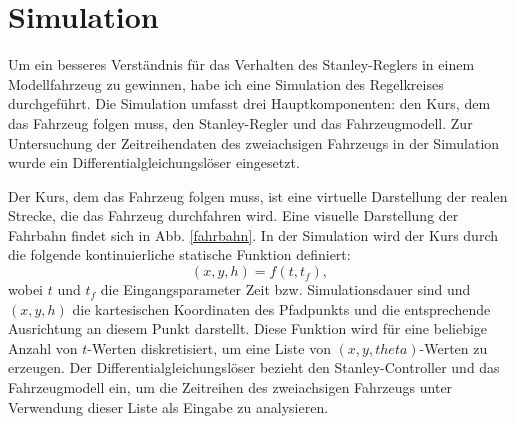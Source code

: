 \documentclass[arbeit=studie,oneside,BCOR=12mm]{ArbeitRST}
\begin{document}

\section{Simulation}


Um ein besseres Verständnis für das Verhalten des Stanley-Reglers in einem
Modellfahrzeug zu gewinnen, habe ich eine Simulation des
Regelkreises durchgeführt. Die Simulation umfasst drei Hauptkomponenten: den
Kurs, dem das Fahrzeug folgen muss, den Stanley-Regler und das Fahrzeugmodell.
Zur Untersuchung der Zeitreihendaten des zweiachsigen Fahrzeugs in der
Simulation wurde ein Differentialgleichungslöser eingesetzt.

Der Kurs, dem das Fahrzeug folgen muss, ist eine virtuelle Darstellung der
realen Strecke, die das Fahrzeug durchfahren wird. Eine visuelle
Darstellung der Fahrbahn findet sich in Abb. \ref{fahrbahn}. In der Simulation wird der
Kurs durch die folgende kontinuierliche statische Funktion definiert:
\begin{equation} 
  (x, y, h) = f(t, t_f), 
\end{equation} 
wobei $t$ und $t_f$ die Eingangsparameter Zeit bzw. Simulationsdauer sind
und $(x, y, h)$ die kartesischen Koordinaten des Pfadpunkts und die
entsprechende Ausrichtung an diesem Punkt darstellt. Diese Funktion wird für
eine beliebige Anzahl von $t$-Werten diskretisiert, um eine Liste von $(x, y,
theta)$-Werten zu erzeugen. Der Differentialgleichungslöser bezieht den
Stanley-Controller und das Fahrzeugmodell ein, um die Zeitreihen des
zweiachsigen Fahrzeugs unter Verwendung dieser Liste als Eingabe zu
analysieren.
\end{document}
